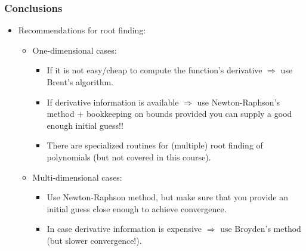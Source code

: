   \begin{frame}[fragile]
    \frametitle{Conclusions}
  
    \begin{itemize}
      \item Recommendations for root finding:
      \begin{itemize}
        \item One-dimensional cases:
        \begin{itemize}
          \item If it is not easy/cheap to compute the function's derivative $\Rightarrow$ use Brent's algorithm.
          \item If derivative information is available $\Rightarrow$ use Newton-Raphson's method + bookkeeping on bounds provided you can supply a good enough initial guess!!
          \item There are specialized routines for (multiple) root finding of polynomials (but not covered in this course).
        \end{itemize}
        \item Multi-dimensional cases:
        \begin{itemize}
          \item Use Newton-Raphson method, but make sure that you provide an initial guess close enough to achieve convergence.
          \item In case derivative information is expensive $\Rightarrow$ use Broyden's method (but slower convergence!).
        \end{itemize}
      \end{itemize}
    \end{itemize}
  \end{frame}
  
  